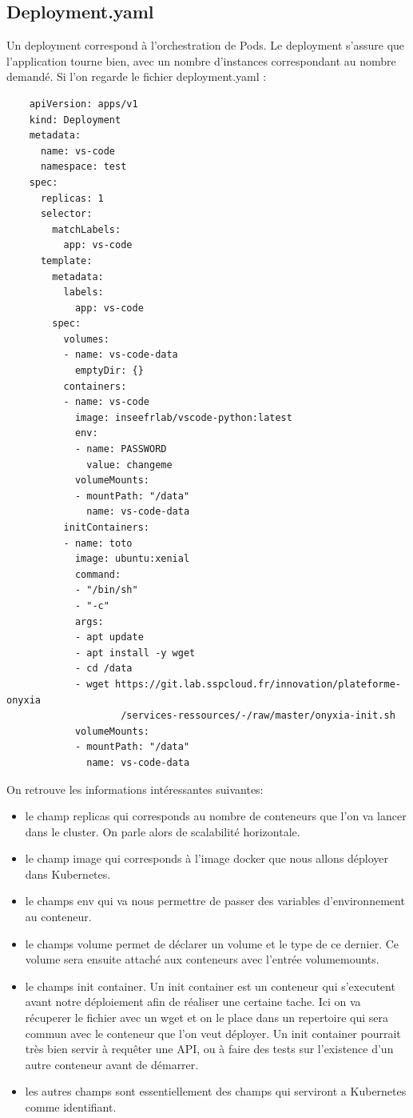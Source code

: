 \documentclass[11pt,fleqn]{book} %
\begin{document}
\subsection*{Deployment.yaml}
Un deployment correspond à l'orchestration de Pods. Le deployment s'assure que l'application tourne bien, avec un nombre d'instances correspondant au nombre demandé. Si l'on regarde le fichier deployment.yaml : 
\begin{verbatim}
    apiVersion: apps/v1
    kind: Deployment
    metadata:
      name: vs-code
      namespace: test
    spec:
      replicas: 1
      selector:
        matchLabels:
          app: vs-code
      template:
        metadata:
          labels:
            app: vs-code
        spec:
          volumes:
          - name: vs-code-data
            emptyDir: {}
          containers:
          - name: vs-code
            image: inseefrlab/vscode-python:latest
            env:
            - name: PASSWORD
              value: changeme
            volumeMounts:
            - mountPath: "/data"
              name: vs-code-data
          initContainers:
          - name: toto
            image: ubuntu:xenial
            command:
            - "/bin/sh"
            - "-c"
            args:
            - apt update
            - apt install -y wget
            - cd /data
            - wget https://git.lab.sspcloud.fr/innovation/plateforme-onyxia
                    /services-ressources/-/raw/master/onyxia-init.sh
            volumeMounts:
            - mountPath: "/data"
              name: vs-code-data
\end{verbatim}

On retrouve les informations intéressantes suivantes: 
\begin{itemize}
    \item le champ replicas qui corresponds au nombre de conteneurs que l'on va lancer dans le cluster. On parle alors de scalabilité horizontale. 
    \item le champ image qui corresponds à l'image docker que nous allons déployer dans Kubernetes.
    \item le champs env qui va nous permettre de passer des variables d'environnement au conteneur.
    \item le champs volume permet de déclarer un volume et le type de ce dernier. Ce volume sera ensuite attaché aux conteneurs avec l'entrée volumemounts.
    \item le champs init container. Un init container est un conteneur qui s'executent avant notre déploiement afin de réaliser une certaine tache. Ici on va récuperer le fichier avec un wget et on le place dans un repertoire qui sera commun avec le conteneur que l'on veut déployer. Un init container pourrait très bien servir à requêter une API, ou à faire des tests sur l'existence d'un autre conteneur avant de démarrer.
    \item les autres champs sont essentiellement des champs qui serviront a Kubernetes comme identifiant.\\
\end{itemize}
\end{document}
